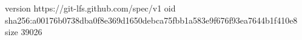 version https://git-lfs.github.com/spec/v1
oid sha256:a00176b0738dba0f8e369d1650debca75fbb1a583e9f676f93ea7644b1f410e8
size 39026
